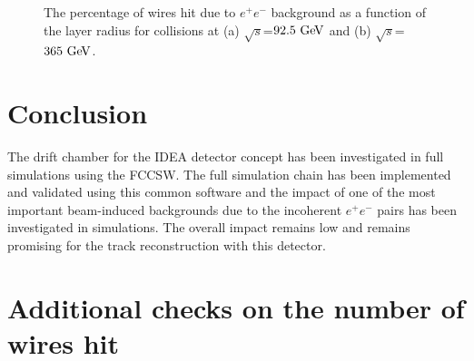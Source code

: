 \documentclass{article}
\begin{document}
\begin{figure}[!t]
\hfil
{}
\caption{The percentage of wires hit due to $e^+e^-$ background as a function of the layer radius for collisions at (a) $\sqrt{s}$=$92.5\,\mathrm{\,Ge\kern -0.1em V}$ and (b) $\sqrt{s}$=$365\,\mathrm{\,Ge\kern -0.1em V}$.}
\label{fig_simhitspercent}
\end{figure}

\section{Conclusion}
The drift chamber for the IDEA detector concept has been investigated in full simulations using the FCCSW. The full simulation chain has been implemented and validated using this common software and the impact of one of the most important beam-induced backgrounds due to the incoherent $e^+e^-$ pairs has been investigated in simulations. The overall impact remains low and remains promising for the track reconstruction with this detector.




\section{Additional checks on the number of wires hit}
\end{document}
